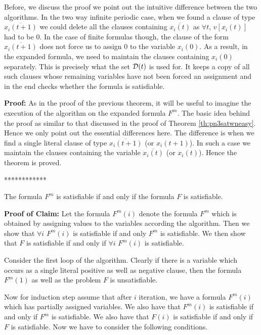 Before, we discuss the proof we point out the intuitive difference between the
two algorithms. In the
two way infinite periodic case, when we found a clause of type 
$\overline{x_i(t+1)}$
we could delete all the clauses containing 
$\overline{x_i(t)}$ as $\forall t$, $v[x_i(t)]$ had to be 0.
In the case of finite formulas though, the clause of the form 
$\overline{x_i(t+1)}$ does 
not force us to assign 0 to the variable $x_i(0)$. As a result, in the expanded
formula, we need to maintain the clauses containing $x_i(0)$ separately.
This is precisely what the set ${\cal D}(t)$ is used for. 
It keeps a copy of all such clauses
whose remaining variables  have not been forced an assignment and in the end
checks whether the formula is satisfiable.



\noindent
{\bf Proof:} As in the proof of the previous theorem, it will be useful to
imagine the execution of the algorithm on the expanded formula $F^m$.
The basic idea behind the proof as similar to that discussed in the proof
of Theorem \ref{th:pn3satwneasy}. Hence we only point out the essential
differences here. The difference is when we find a single literal clause
of type $\overline{x_i(t+1)}$ (or $x_i(t+1)$). In such a case we maintain
the clauses containing the variable $\overline{x_i(t)}$ (or $x_i(t)$).
Hence the theorem is proved. \hfill\QED





\iffalse*************
\begin{claim}
The formula $F^m$ is satisfiable if and only if the formula $F$ is satisfiable.
\end{claim}

\noindent
{\bf Proof of Claim:} Let the formula $F^m(i)$ denote the formula $F^m$ 
which is obtained by assigning values to the variables according the 
algorithm. Then we show that $\forall i$ $F^m(i)$ is satisfiable if and
only $F^m$ is satisfiable. We then show that $F$ is satisfiable if and
only if $\forall i$ $F^m(i)$ is satisfiable.

Consider the first loop of the algorithm. Clearly if there is a variable which
occurs as a single literal positive as well as negative clause, then the
formula $F^m(1)$ as well as the problem $F$ is unsatisfiable.

Now for induction step assume that after $i$ iteration, we have a formula
$F^m(i)$ which has partially assigned variables. We also have that $F^m(i)$ is
satisfiable if and only if $F^m$ is satisfiable. We also have that $F(i)$ is
satisfiable if and only if $F$ is satisfiable. Now we have to consider the 
following conditions.

